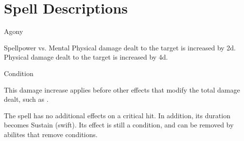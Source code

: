 \section{Spell Descriptions}
\begin{spellsection}{Agony}
\begin{spellheader}
\end{spellheader}
\begin{spellcontent}
\begin{spelltargetinginfo}
\end{spelltargetinginfo}
\begin{spelleffects}
\begin{spellattack}{Spellpower vs. Mental}
\spellsuccess Physical damage dealt to the target is increased by \plus2d.
\spellcritical Physical damage dealt to the target is increased by \plus4d.
\end{spellattack}
\spelldur Condition
\end{spelleffects}
\end{spellcontent}
\begin{spellfooter}
\spellnotes This damage increase applies before other effects that modify the total damage dealt, such as .
\miscastexplode
\end{spellfooter}
\begin{spellcantrip}
The spell has no additional effects on a critical hit.
In addition, its duration becomes Sustain (swift).
Its effect is still a condition, and can be removed by abilites that remove conditions.
\end{spellcantrip}
\end{spellsection}
